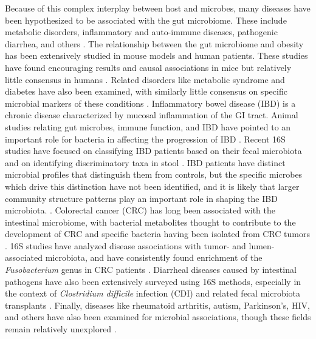 \documentclass[12pt]{article}
\begin{document}
Because of this complex interplay between host and microbes, many 
diseases have been hypothesized to be associated with the gut 
microbiome. These include metabolic disorders,
inflammatory and auto-immune diseases, pathogenic diarrhea, and others \cite{nash-baker, turnbaugh-energy_harvest-2006, edd-singh, par-schep}.
The relationship between the gut microbiome and obesity has been 
extensively studied in mouse models and human patients. These studies
have found encouraging results and causal associations in mice but 
relatively little consensus in humans \cite{turnbaugh-energy_harvest-2006, ridaura-mouse_fmt-2013, ob-escobar, walters-ob_meta-2014}. 
Related disorders like metabolic 
syndrome and diabetes have also been examined, with similarly little consensus on
specific microbial markers of these conditions \cite{mets-stad, ob-ross}. 
Inflammatory bowel disease (IBD) is a chronic disease characterized by 
mucosal inflammation of the GI tract. Animal studies relating gut 
microbes, immune function, and IBD have pointed to an important role for 
bacteria in affecting the progression of IBD \cite{tamboli-ibd-2004}. 
Recent 16S studies have focused on classifying IBD patients based on 
their fecal microbiota and on identifying discriminatory taxa in stool 
\cite{ibd-papa, ibd-gevers}. IBD patients have distinct microbial profiles 
that distinguish them from controls, but the specific microbes which
drive this distinction have not been identified, and it is likely that
larger community structure patterns play an important role in shaping
the IBD microbiota. \cite{walters-ob_meta-2014, ibd-papa, ibd-gevers}.
Colorectal cancer (CRC) has long been associated with the intestinal 
microbiome, with bacterial metabolites thought to contribute to the 
development of CRC and specific bacteria having been isolated from CRC 
tumors \cite{crc_zeller, crc_xiang}. 16S studies have analyzed disease associations with 
tumor- and lumen-associated microbiota, and have consistently found 
enrichment of the \textit{Fusobacterium} genus in CRC patients
\cite{crc_zeller, crc_zhao, crc_zhu, crc_zackular}. 
Diarrheal diseases caused by intestinal pathogens have also been extensively 
surveyed using 16S methods, especially in the context of 
\textit{Clostridium difficile} infection (CDI) and related fecal 
microbiota transplants \cite{cdi_schubert, cdi_vincent}. Finally, diseases like rheumatoid 
arthritis, autism, Parkinson's, HIV, and others have also been 
examined for microbial associations, though these fields remain 
relatively unexplored \cite{asd-kb, par-schep, ra-littman, hiv-dinh}.
\end{document}
